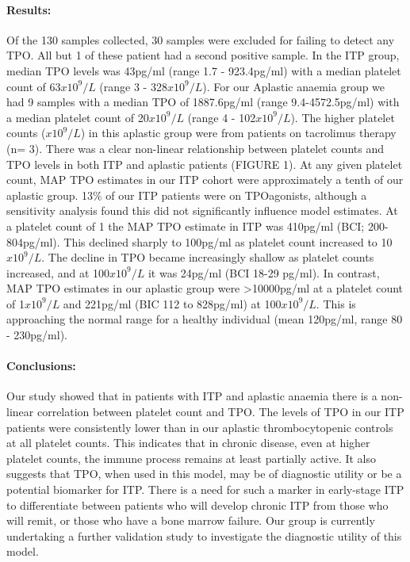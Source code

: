 \documentclass[11pt]{article}
\begin{document}
\paragraph{Results:} Of the 130 samples collected, 30 samples were excluded for failing to detect any TPO. All but 1 of these patient had a second positive sample. In the ITP group, median TPO levels was 43pg/ml (range 1.7 - 923.4pg/ml) with a median platelet count of 63$x10^9/L$ (range 3 - 328$x10^9/L$). For our Aplastic anaemia group we had 9 samples with a median TPO of 1887.6pg/ml (range 9.4-4572.5pg/ml) with a median platelet count of 20$x10^9/L$ (range 4 - 102$x10^9/L$). The higher platelet counts ($x10^9/L$) in this aplastic group were from patients on tacrolimus therapy (n= 3). There was a clear non-linear relationship between platelet counts and TPO levels in both ITP and aplastic patients (FIGURE 1). At any given platelet count, MAP TPO estimates in our ITP cohort were approximately a tenth of our aplastic group. 13\% of our ITP patients were on TPOagonists, although a sensitivity analysis found this did not significantly influence model estimates. At a platelet count of 1 the MAP TPO estimate in ITP was 410pg/ml (BCI; 200-804pg/ml). This declined sharply to 100pg/ml as platelet count increased to 10$x10^9/L$. The decline in TPO became increasingly shallow as platelet counts increased, and at 100$x10^9/L$ it was 24pg/ml (BCI 18-29 pg/ml). In contrast, MAP TPO estimates in our aplastic group were >10000pg/ml at a platelet count of 1$x10^9/L$ and 221pg/ml (BIC 112 to 828pg/ml) at 100$x10^9/L$. This is approaching the normal range for a healthy individual (mean 120pg/ml, range 80 - 230pg/ml).



\paragraph{Conclusions:} Our study showed that in patients with ITP and aplastic anaemia there is a non-linear correlation between platelet count and TPO. The levels of TPO in our ITP patients were consistently lower than in our aplastic thrombocytopenic controls at all platelet counts. This indicates that in chronic disease, even at higher platelet counts, the immune process remains at least partially active. It also suggests that TPO, when used in this model, may be of diagnostic utility or be a potential biomarker for ITP. There is a need for such a marker in early-stage ITP to differentiate between patients who will develop chronic ITP from those who will remit, or those who have a bone marrow failure. Our group is currently undertaking a further validation study to investigate the diagnostic utility of this model.
\end{document}
